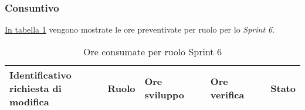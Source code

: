 \subsubsection{Consuntivo}
\hyperref[tab:sprint6_ore_consumate]{In tabella \ref{tab:sprint6_ore_consumate}} vengono mostrate le ore preventivate per ruolo per lo \textit{Sprint 6}.

\begin{table}[H]
    \centering
    \begin{tabular}{| l | l | l | l | l |}
        \hline
            \makecell{\textbf{Identificativo} \\ \textbf{richiesta di modifica}} &
            \textbf{Ruolo} & 
            \textbf{Ore sviluppo} &
            \textbf{Ore verifica} & 
            \textbf{Stato}\\ 
        \hline
        \hline
    \end{tabular}
    \caption{Ore consumate per ruolo Sprint 6}
    \label{tab:sprint6_ore_consumate} 
\end{table}